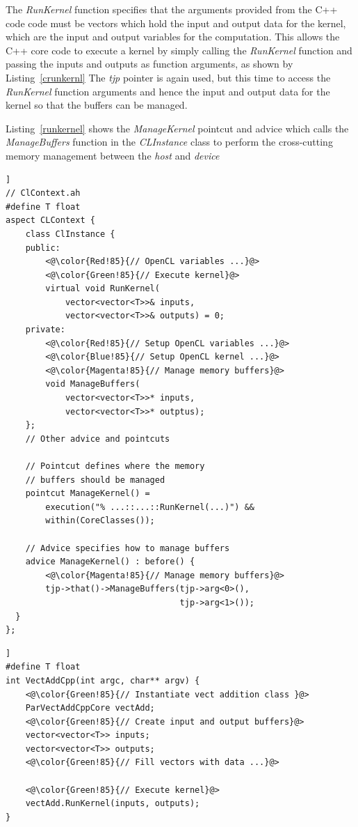 \documentclass{sig-alternate-05-2015}
\begin{document}
The \textit{RunKernel} function specifies that the arguments provided from the
C++ code code must be vectors which hold the input and output data for the
kernel, which are the input and output variables for the computation. This
allows the C++ core code to execute a kernel by simply calling the
\textit{RunKernel} function and passing the inputs and outputs as function
arguments, as shown by Listing~\ref{crunkernl} The \textit{tjp} pointer is 
again used, but this time to access the \textit{RunKernel} function arguments 
and hence the input and output data for the kernel so that the buffers can be managed.

Listing~\ref{runkernel} shows the \textit{ManageKernel} pointcut and advice
which calls the \textit{ManageBuffers} function in the \textit{CLInstance} class
to perform the cross-cutting memory management between the \textit{host} and
\textit{device}

\begin{lstlisting}[caption=Abstract aspect components with hide kernel
cross-cutting concerns,label=runkernel,float=[!t]]
// ClContext.ah
#define T float
aspect CLContext {
	class ClInstance {
	public:
		<@\color{Red!85}{// OpenCL variables ...}@>
		<@\color{Green!85}{// Execute kernel}@>
		virtual void RunKernel(
			vector<vector<T>>& inputs,
			vector<vector<T>>& outputs) = 0;
	private:
		<@\color{Red!85}{// Setup OpenCL variables ...}@>
		<@\color{Blue!85}{// Setup OpenCL kernel ...}@>
		<@\color{Magenta!85}{// Manage memory buffers}@>
		void ManageBuffers(
			vector<vector<T>>* inputs,
			vector<vector<T>>* outptus);
	};
	// Other advice and pointcuts 

	// Pointcut defines where the memory 
	// buffers should be managed
	pointcut ManageKernel() = 
		execution("% ...::...::RunKernel(...)") &&
		within(CoreClasses());

	// Advice specifies how to manage buffers
	advice ManageKernel() : before() {
		<@\color{Magenta!85}{// Manage memory buffers}@>
		tjp->that()->ManageBuffers(tjp->arg<0>(),
								   tjp->arg<1>());
  }
};
\end{lstlisting}

\begin{lstlisting}[caption=C++ core class executing a pallel kernel using
standard c++,label=crunkernel,float=[!t]]
#define T float
int VectAddCpp(int argc, char** argv) {
	<@\color{Green!85}{// Instantiate vect addition class }@>
	ParVectAddCppCore vectAdd;
	<@\color{Green!85}{// Create input and output buffers}@>
	vector<vector<T>> inputs;
	vector<vector<T>> outputs;
	<@\color{Green!85}{// Fill vectors with data ...}@>
  
	<@\color{Green!85}{// Execute kernel}@>
	vectAdd.RunKernel(inputs, outputs);
}
\end{lstlisting}
\end{document}
